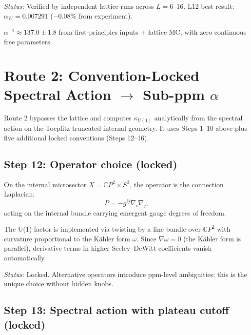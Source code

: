 \documentclass[12pt,a4paper]{article}
\begin{document}
\textit{Status:} Verified by independent lattice runs across $L = 6$--$16$.
L12 best result: $\alpha_W = 0.007291$ ($-0.08\%$ from experiment).

\begin{tcolorbox}[colback=green!5!white,colframe=green!50!black,
title={Route 1 Result}]
$\alpha^{-1} \approx 137.0 \pm 1.8$ from first-principles inputs +
lattice MC, with zero continuous free parameters.
\end{tcolorbox}

\section{Route 2: Convention-Locked Spectral Action $\to$ Sub-ppm $\alpha$}
\label{sec:route2}

Route 2 bypasses the lattice and computes $\kappa_{U(1)}$ analytically
from the spectral action on the Toeplitz-truncated internal geometry.
It uses Steps 1--10 above plus five additional locked conventions
(Steps 12--16).

\subsection{Step 12: Operator choice (locked)}

On the internal microsector $X = \mathbb{C}P^2 \times S^3$, the operator
is the connection Laplacian:
\begin{equation}\tag{E12}
P = -g^{ij}\nabla_i\nabla_j,
\end{equation}
acting on the internal bundle carrying emergent gauge degrees of freedom.

The U(1) factor is implemented via twisting by a line bundle over
$\mathbb{C}P^2$ with curvature proportional to the K\"ahler form $\omega$.
Since $\nabla\omega = 0$ (the K\"ahler form is parallel), derivative terms
in higher Seeley--DeWitt coefficients vanish automatically.

\textit{Status:} Locked.  Alternative operators introduce ppm-level
ambiguities; this is the unique choice without hidden knobs.

\subsection{Step 13: Spectral action with plateau cutoff (locked)}
\end{document}
